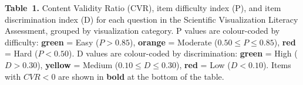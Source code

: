 \documentclass{article}
\begin{document}
\begin{center}
\small\textbf{Table~1.}
Content Validity Ratio (CVR), item difficulty index (P), and item discrimination index (D)
for each question in the Scientific Visualization Literacy Assessment, grouped by
visualization category.
P values are colour-coded by difficulty:
{\color{ForestGreen}\textbf{green}} = Easy ($P > 0.85$),
{\color{BurntOrange}\textbf{orange}} = Moderate ($0.50 \leq P \leq 0.85$),
{\color{BrickRed}\textbf{red}} = Hard ($P < 0.50$).
D values are colour-coded by discrimination:
{\color{ForestGreen}\textbf{green}} = High ($D > 0.30$),
{\color{Goldenrod}\textbf{yellow}} = Medium ($0.10 \leq D \leq 0.30$),
{\color{BrickRed}\textbf{red}} = Low ($D < 0.10$).
Items with $CVR < 0$ are shown in \textbf{bold} at the bottom of the table.
\end{center}
\vspace{4pt}
\end{document}
